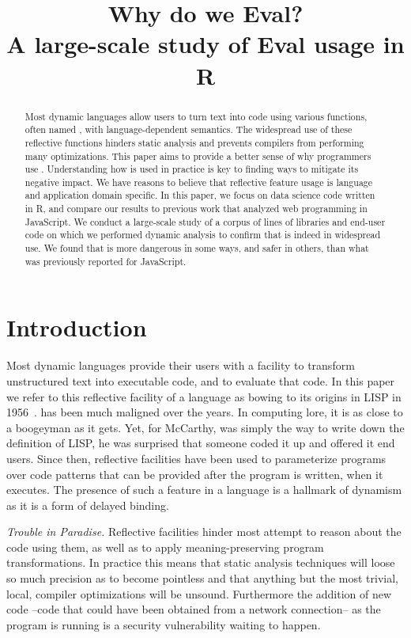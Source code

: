 \documentclass[USenglish,cleveref, autoref, thm-restate]{lipics-v2019}
\title{Why do we Eval?\\[2mm]\Large A large-scale study of Eval usage in R}
\begin{document}
\maketitle

\begin{abstract}
  \noindent Most dynamic languages allow users to turn text into code
  using various functions, often named \eval, with language-dependent
  semantics. The widespread use of these reflective functions hinders
  static analysis and prevents compilers from performing many
  optimizations. This paper aims to provide a better sense of why
  programmers use \eval.  Understanding how \eval is used in practice
  is key to finding ways to mitigate its negative impact. We have
  reasons to believe that reflective feature usage is language and
  application domain specific. In this paper, we focus on data science
  code written in R, and compare our results to previous work that
  analyzed web programming in JavaScript.  We conduct a large-scale
  study of a corpus of \CorpusAllCodeRnd lines of libraries and
  end-user code on which we performed dynamic analysis to confirm that
  \eval is indeed in widespread use. We found that \eval is more
  dangerous in some ways, and safer in others, than what was
  previously reported for JavaScript.
\end{abstract}


\section{Introduction}

Most dynamic languages provide their users with a facility to
transform unstructured text into executable code, and to evaluate that
code. In this paper we refer to this reflective facility of a language
as \eval bowing to its origins in LISP in 1956~\cite{lisp}. \Eval has
been much maligned over the years. In computing lore, it is as close
to a boogeyman as it gets. Yet, for McCarthy, \eval was simply the way
to write down the definition of LISP, he was surprised that someone
coded it up and offered it end users.  Since then, reflective
facilities have been used to parameterize programs over code patterns
that can be provided after the program is written, when it
executes. The presence of such a feature in a language is a hallmark
of dynamism as it is a form of delayed binding.

\vspace{2mm}\noindent\emph{Trouble in Paradise.} Reflective facilities
hinder most attempt to reason about the code using them, as well as to
apply meaning-preserving program transformations. In practice this
means that static analysis techniques will loose so much precision as
to become pointless and that anything but the most trivial, local,
compiler optimizations will be unsound. Furthermore the addition of
new code --code that could have been obtained from a network
connection-- as the program is running is a security vulnerability
waiting to happen.
\end{document}
